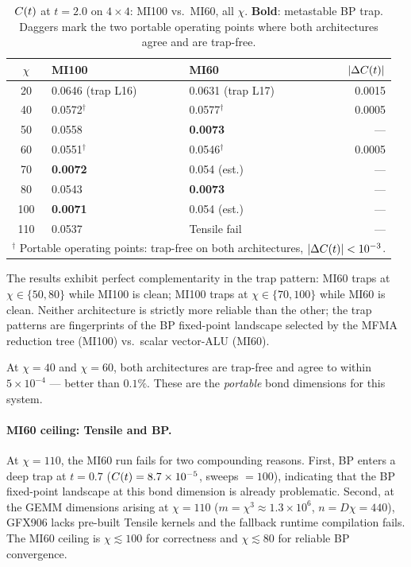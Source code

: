 \begin{table}[ht]
\centering
\caption{$C(t)$ at $t = 2.0$ on $4\times4$: MI100 vs.\ MI60, all $\chi$.
  \textbf{Bold}: metastable BP trap.
  Daggers mark the two portable operating points where both architectures agree
  and are trap-free.}
\label{tab:mi60_chi}
\begin{tabular}{cllr}
\toprule
$\chi$ & MI100 & MI60 & $|\Delta C(t)|$ \\
\midrule
20  & 0.0646 (trap L16) & 0.0631 (trap L17) & 0.0015 \\
40  & 0.0572$^\dagger$  & 0.0577$^\dagger$   & 0.0005 \\
50  & 0.0558            & \textbf{0.0073}    & ---    \\
60  & 0.0551$^\dagger$  & 0.0546$^\dagger$   & 0.0005 \\
70  & \textbf{0.0072}   & 0.054 (est.)       & ---    \\
80  & 0.0543            & \textbf{0.0073}    & ---    \\
100 & \textbf{0.0071}   & 0.054 (est.)       & ---    \\
110 & 0.0537            & Tensile fail       & ---    \\
\midrule
\multicolumn{4}{l}{$^\dagger$ Portable operating points: trap-free on both architectures,
  $|\Delta C(t)| < 10^{-3}$.}\\
\bottomrule
\end{tabular}
\end{table}

The results exhibit perfect complementarity in the trap pattern:
MI60 traps at $\chi \in \{50, 80\}$ while MI100 is clean;
MI100 traps at $\chi \in \{70, 100\}$ while MI60 is clean.
Neither architecture is strictly more reliable than the other;
the trap patterns are fingerprints of the BP fixed-point landscape
selected by the MFMA reduction tree (MI100) vs.\ scalar vector-ALU (MI60).

At $\chi=40$ and $\chi=60$, both architectures are trap-free and agree
to within $5\times10^{-4}$ --- better than $0.1\%$.
These are the \emph{portable} bond dimensions for this system.

\paragraph{MI60 ceiling: Tensile and BP.}
At $\chi=110$, the MI60 run fails for two compounding reasons.
First, BP enters a deep trap at $t=0.7$ ($C(t) = 8.7\times10^{-5}$,
sweeps $= 100$), indicating that the BP fixed-point landscape at this
bond dimension is already problematic.
Second, at the GEMM dimensions arising at $\chi=110$
($m = \chi^3 \approx 1.3\times10^6$, $n = D\chi = 440$),
GFX906 lacks pre-built Tensile kernels and the fallback
runtime compilation fails.
The MI60 ceiling is $\chi \lesssim 100$ for correctness and
$\chi \lesssim 80$ for reliable BP convergence.

